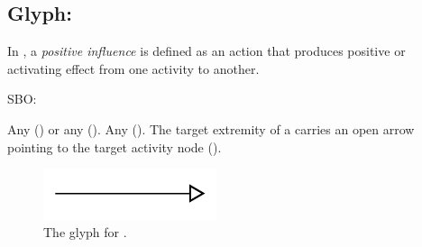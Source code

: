 \subsection{Glyph: }
\label{sec:af:positive_infl}

In \SBGNAFLone, a \emph{positive influence} is defined as an action that produces positive or activating effect from one activity to another.   

\begin{glyphDescription}

\glyphSboTerm SBO:

 \glyphOrigin Any  () or any  ().
 \glyphTarget Any  ().
 \glyphEndPoint The target extremity of a  carries an open arrow pointing to the target activity node ().


\end{glyphDescription}

\begin{figure}[H]
  \centering
  \includegraphics[width = 2in]{images/positiveInfluence}
  \caption{The \AF glyph for .}
  \label{fig:af:positiveInfl}
\end{figure}
